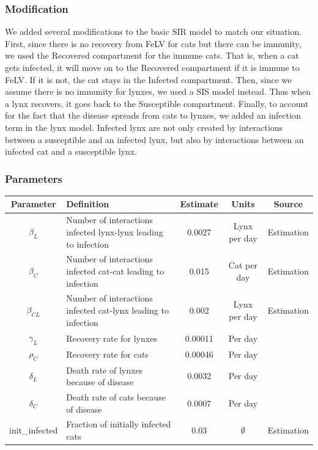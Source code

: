 \documentclass[12pt]{article}
\begin{document}
\subsubsection{Modification}
\quad We added several modifications to the basic SIR model to match our situation. First, since there is no recovery from FeLV for cats but there can be immunity, we used the Recovered compartment for the immune cats. That is, when a cat gets infected, it will move on to the Recovered compartment if it is immune to FeLV. If it is not, the cat stays in the Infected compartment.\cite{fromont_modelling_1997} Then, since we assume there is no immunity for lynxes, we used a SIS model instead. Thus when a lynx recovers, it goes back to the Susceptible compartment. Finally, to account for the fact that the disease spreads from cats to lynxes, we added an infection term in the lynx model. Infected lynx are not only created by interactions between a susceptible and an infected lynx, but also by interactions between an infected cat and a susceptible lynx.

\subsubsection{Parameters}

\begin{tabular}{|c| p{6cm}|c|c|c|}
	
	\hline
	Parameter & Definition & Estimate & Units & Source \\
	\hline
	$\beta_{L}$ & Number of interactions infected lynx-lynx leading to infection & 0.0027 & Lynx per day & Estimation \\
	\hline
	$\beta_{C}$ & Number of interactions infected cat-cat leading to infection & 0.015 & Cat per day & Estimation \\
	\hline
	$\beta_{CL}$ & Number of interactions infected cat-lynx leading to infection & 0.002 & Lynx per day & Estimation \\
	\hline
	$\gamma_{L}$ & Recovery rate for lynxes & 0.00011 & Per day & \cite{meli_feline_2010} \\
	\hline
	$\rho_{C}$ & Recovery rate for cats & 0.00046 & Per day & \cite{fromont_modelling_1997} \\
	\hline
	$\delta_{L}$ & Death rate of lynxes because of disease & 0.0032 & Per day & \cite{meli_feline_2010} \\
	\hline
	$\delta_{C}$ & Death rate of cats because of disease & 0.0007 & Per day & \cite{fromont_modelling_1997} \\
	\hline
	init\_infected & Fraction of initially infected cats & 0.03 & $\emptyset$ & Estimation\\
	\hline
\end{tabular} \\\\
\end{document}

